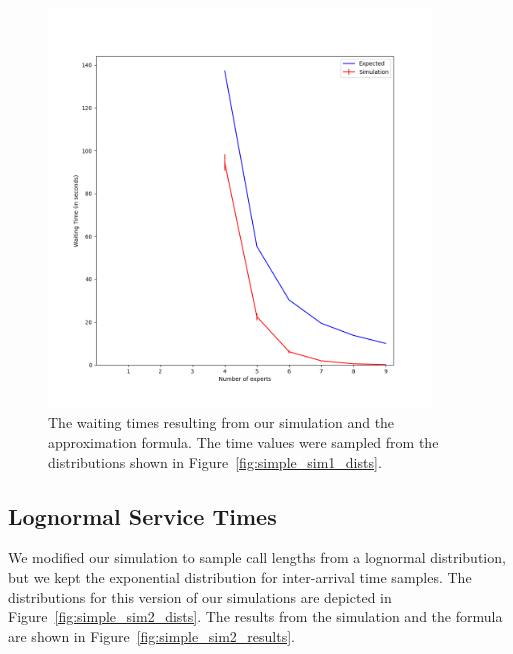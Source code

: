 \begin{figure}[h]
  \includegraphics[width=4in]{figures/montecarlo/independent_calls_expon.png}
  \caption{
    The waiting times resulting from our simulation and the approximation
    formula.
    The time values were sampled from the distributions shown in
    Figure~\ref{fig:simple_sim1_dists}.
  }\label{fig:simple_sim1_results}
\end{figure}

\subsection{Lognormal Service Times}

We modified our simulation to sample call lengths from a lognormal distribution,
but we kept the exponential distribution for inter-arrival time samples.
The distributions for this version of our simulations are depicted in
Figure~\ref{fig:simple_sim2_dists}.
The results from the simulation and the formula are shown in
Figure~\ref{fig:simple_sim2_results}.

